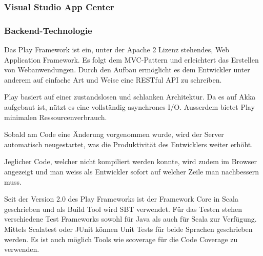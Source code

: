 \subsubsection{Visual Studio App Center}


\subsubsection{Backend-Technologie}
Das Play Framework \cite{PlayFramework} ist ein, unter der Apache 2 Lizenz stehendes, Web Application Framework. Es folgt dem MVC-Pattern und erleichtert das Erstellen von Webanwendungen. Durch den Aufbau ermöglicht es dem Entwickler unter anderem auf einfache Art und Weise eine RESTful API zu schreiben. 

Play basiert auf einer zustandslosen und schlanken Architektur. Da es auf Akka aufgebaut ist, nützt es eine vollständig asynchrones I/O. Ausserdem bietet Play minimalen Ressourcenverbrauch. 

Sobald am Code eine Änderung vorgenommen wurde, wird der Server automatisch neugestartet, was die Produktivität des Entwicklers  weiter erhöht.

Jeglicher Code, welcher nicht kompiliert werden konnte, wird zudem im Browser angezeigt und man weiss als Entwickler sofort auf welcher Zeile man nachbessern muss. 

Seit der Version 2.0 des Play Frameworks ist der Framework Core in Scala geschrieben und als Build Tool wird SBT verwendet. Für das Testen stehen verschiedene Test Frameworks sowohl für Java als auch für Scala zur Verfügung. Mittels Scalatest oder JUnit können Unit Tests für beide Sprachen geschrieben werden. Es ist auch möglich Tools wie scoverage für die Code Coverage zu verwenden. 
